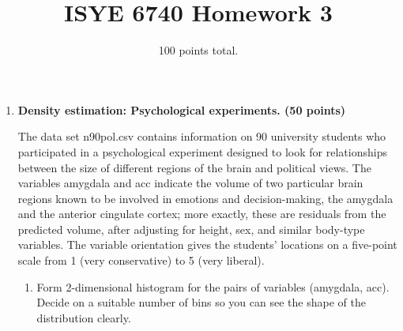 \documentclass[twoside,10pt]{article}
\begin{document}
\title{ISYE 6740 Homework 3}
\date{100 points total.}
\maketitle




\begin{enumerate}


\item {\bf Density estimation: Psychological experiments. (50 points)}

 The data set \textsf{n90pol.csv} contains information on 90 university students who participated in a psychological experiment designed to look for relationships between the size of different regions of the brain and political views. The variables \textsf{amygdala} and \textsf{acc} indicate the volume of two particular brain regions known to be involved in emotions and decision-making, the amygdala and the anterior cingulate cortex; more exactly, these are residuals from the predicted volume, after adjusting for height, sex, and similar body-type variables. The variable \textsf{orientation} gives the students' locations on a five-point scale from 1 (very conservative) to 5 (very liberal). %
 
 \begin{enumerate}
 \item Form 2-dimensional histogram for the pairs of variables (\textsf{amygdala}, \textsf{acc}). Decide on a suitable number of bins so you can see the shape of the distribution clearly. 
 

\end{enumerate}
\end{enumerate}
\end{document}
